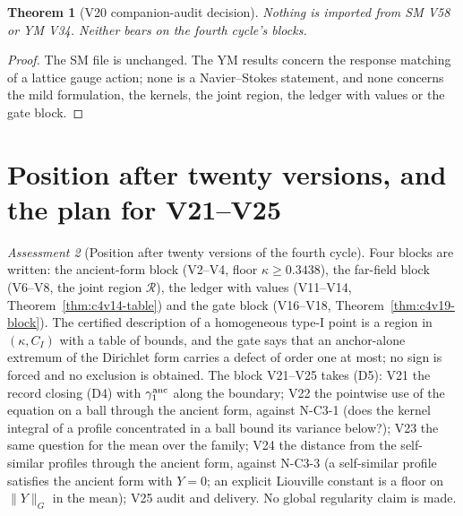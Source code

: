 \documentclass[11pt]{article}
\theoremstyle{plain}
\newtheorem{theorem}{Theorem}[section]
\theoremstyle{definition}
\theoremstyle{remark}
\newtheorem{assessment}[theorem]{Assessment}
\begin{document}
\begin{theorem}[V20 companion-audit decision]
\label{thm:c4v20-companion-decision}
Nothing is imported from SM V58 or YM V34.  Neither bears on the
fourth cycle's blocks.
\end{theorem}

\begin{proof}
The SM file is unchanged.  The YM results concern the response
matching of a lattice gauge action; none is a Navier--Stokes
statement, and none concerns the mild formulation, the kernels, the
joint region, the ledger with values or the gate block.
\end{proof}

\section{Position after twenty versions, and the plan for V21--V25}
\label{sec:c4v20-position}

\begin{assessment}[Position after twenty versions of the fourth cycle]
\label{ass:c4v20-position-twenty}
Four blocks are written: the ancient-form block (V2--V4, floor
\(\kappa\ge0.3438\)), the far-field block (V6--V8, the joint region \(\mathcal R\)), the
ledger with values (V11--V14, Theorem~\ref{thm:c4v14-table}) and the gate
block (V16--V18, Theorem~\ref{thm:c4v19-block}).  The certified
description of a homogeneous type-I point is a region in \((\kappa,C_I)\)
with a table of bounds, and the gate says that an anchor-alone
extremum of the Dirichlet form carries a defect of order one at
most; no sign is forced and no exclusion is obtained.  The block
V21--V25 takes (D5): V21 the record closing (D4) with \(\gamma_1^{\rm anc}\) along
the boundary; V22 the pointwise use of the equation on a ball
through the ancient form, against N-C3-1 (does the kernel integral
of a profile concentrated in a ball bound its variance below?);
V23 the same question for the mean over the family; V24 the
distance from the self-similar profiles through the ancient form,
against N-C3-3 (a self-similar profile satisfies the ancient form
with \(Y=0\); an explicit Liouville constant is a floor on \(\|Y\|_G\) in the
mean); V25 audit and delivery.  No global regularity claim is made.
\end{assessment}

\end{document}
